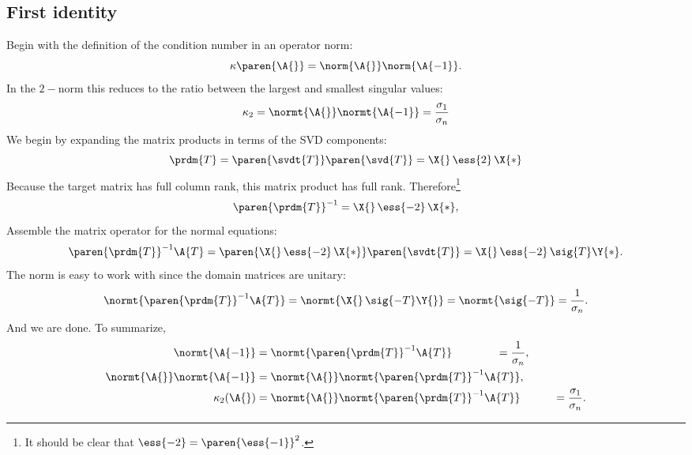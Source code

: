 \subsection{First identity}
Begin with the definition of the condition number in an operator norm:
\begin{equation}
  \kappa\paren{\A{}} = \norm{\A{}}\norm{\A{-1}}.
\end{equation}
In the $2-$norm this reduces to the ratio between the largest and smallest singular values:
\begin{equation}
  \kappa_{2} = \normt{\A{}}\normt{\A{-1}} = \frac{\sigma_{1}}{\sigma_{n}} 
\end{equation}
We begin by expanding the matrix products in terms of the SVD components:
\begin{equation}
  \prdm{T} = \paren{\svdt{T}} \paren{\svd{T}} = \X{}\,\ess{2}\,\X{*}
\end{equation}
Because the target matrix has full column rank, this matrix product has full rank.
Therefore\footnote{It should be clear that $\ess{-2} = \paren{\ess{-1}}^{2}$.}
\begin{equation}
  \paren{\prdm{T}}^{-1} = \X{}\,\ess{-2}\,\X{*},
  \label{eq:golub:atainv}
\end{equation}
Assemble the matrix operator for the normal equations:
\begin{equation}
  \paren{\prdm{T}}^{-1}\A{T} = \paren{\X{}\,\ess{-2}\,\X{*}} \paren{\svdt{T}} = \X{}\,\ess{-2}\,\sig{T}\Y{*}.
\end{equation}
The norm is easy to work with since the domain matrices are unitary:
\begin{equation}
  \normt{ \paren{\prdm{T}}^{-1}\A{T} } = \normt{ \X{}\,\sig{-T}\Y{} } = \normt{ \sig{-T} } = \frac{1}{\sigma_{n}}.
\end{equation}
And we are done.
To summarize,
\begin{equation}
  \begin{split}
     \normt{\A{-1}} &= \normt{\paren{\prdm{T}}^{-1}\A{T}} \qquad \qquad = \frac{1}{\sigma_{n}},  \\
     \normt{\A{}}\normt{\A{-1}} &= \normt{\A{}}\normt{\paren{\prdm{T}}^{-1}\A{T}}, \\
     \kappa_{2}(\A{}) &= \normt{\A{}}\normt{\paren{\prdm{T}}^{-1}\A{T}} \quad \qquad = \frac{\sigma_{1}}{\sigma_{n}}.
  \end{split}
\end{equation}

